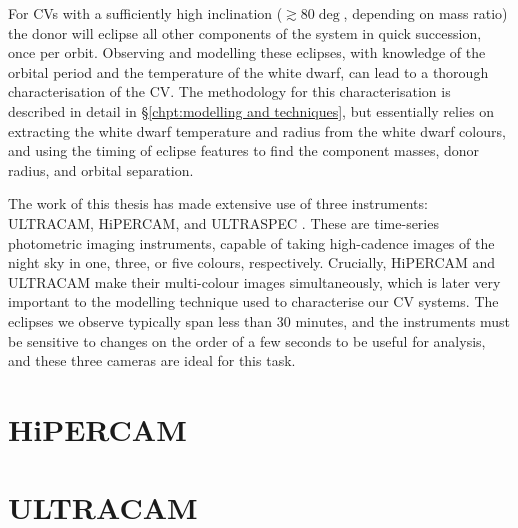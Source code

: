 
\label{chpt:observations and observational techniques} %



For CVs with a sufficiently high inclination ($\gtrsim 80 \deg$, depending on mass ratio) the donor will eclipse all other components of the system in quick succession, once per orbit. Observing and modelling these eclipses, with knowledge of the orbital period and the temperature of the white dwarf, can lead to a thorough characterisation of the CV. The methodology for this characterisation is described in detail in \S\ref{chpt:modelling and techniques}, but essentially relies on extracting the white dwarf temperature and radius from the white dwarf colours, and using the timing of eclipse features to find the component masses, donor radius, and orbital separation.

The work of this thesis has made extensive use of three instruments: ULTRACAM, HiPERCAM, and ULTRASPEC .
These are time-series photometric imaging instruments, capable of taking high-cadence images of the night sky in one, three, or five colours, respectively. Crucially, HiPERCAM and ULTRACAM make their multi-colour images simultaneously, which is later very important to the modelling technique used to characterise our CV systems. The eclipses we observe typically span less than 30 minutes, and the instruments must be sensitive to changes on the order of a few seconds to be useful for analysis, and these three cameras are ideal for this task.


\section{HiPERCAM}


\section{ULTRACAM}


